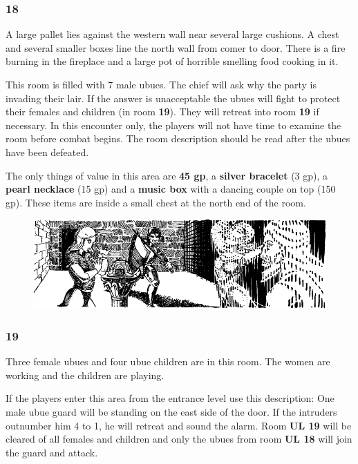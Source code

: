 \documentclass[palace_of_the_silver_princess]{subfiles}
\begin{document}
\subsubsection{18}
\begin{quotebox}
    A large pallet lies against the western wall near several large
    cushions. A chest and several smaller boxes line the north wall from
    comer to door. There is a fire burning in the fireplace and a large
    pot of horrible smelling food cooking in it.
\end{quotebox}

This room is filled with 7 male ubues.  The chief will ask why the party
is invading their lair. If the answer is unacceptable the ubues will
fight to protect their females and children (in room \textbf{19}). They
will retreat into room \textbf{19} if necessary. In this encounter only,
the players will not have time to examine the room before combat begins.
The room description should be read after the ubues have been defeated.

The only things of value in this area are \textbf{45 gp}, a
\textbf{silver bracelet} (3 gp), a \textbf{pearl necklace} (15 gp) and a
\textbf{music box} with a dancing couple on top (150 gp). These items
are inside a small chest at the north end of the room.

\begin{figure}[!ht]
    \includegraphics[width=\textwidth]{img/ruby_box.png}
\end{figure}

\subsubsection{19}

Three female ubues and four ubue children are in this room.  The women
are working and the children are playing.  

If the players enter this area from the entrance level use this
description: One male ubue guard will be standing on the east side of
the door. If the intruders outnumber him 4 to 1, he will retreat and
sound the alarm. Room \textbf{UL 19} will be cleared of all females and
children and only the ubues from room \textbf{UL 18} will join the guard
and attack.
\end{document}
